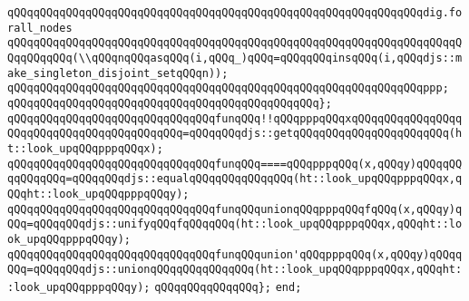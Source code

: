 \newline
\verb|qQQqqQQqqQQqqQQqqQQqqQQqqQQqqQQqqQQqqQQqqQQqqQQqqQQqqQQqqQQqqQQqdig.forall_nodes|\newline
\verb|qQQqqQQqqQQqqQQqqQQqqQQqqQQqqQQqqQQqqQQqqQQqqQQqqQQqqQQqqQQqqQQqqQQqqQQqqQQqqQQq(\\qQQqnqQQqasqQQq(i,qQQq_)qQQq=qQQqqQQqinsqQQq(i,qQQqdjs::make_singleton_disjoint_setqQQqn));|\newline
\newline
\verb|qQQqqQQqqQQqqQQqqQQqqQQqqQQqqQQqqQQqqQQqqQQqqQQqqQQqqQQqqQQqqQQqppp;|\newline
\verb|qQQqqQQqqQQqqQQqqQQqqQQqqQQqqQQqqQQqqQQqqQQqqQQq};|\newline
\newline
\verb|qQQqqQQqqQQqqQQqqQQqqQQqqQQqqQQqfunqQQq!!qQQqpppqQQqxqQQqqQQqqQQqqQQqqQQqqQQqqQQqqQQqqQQqqQQqqQQq=qQQqqQQqdjs::getqQQqqQQqqQQqqQQqqQQqqQQq(ht::look_upqQQqpppqQQqx);|\newline
\verb|qQQqqQQqqQQqqQQqqQQqqQQqqQQqqQQqfunqQQq====qQQqpppqQQq(x,qQQqy)qQQqqQQqqQQqqQQq=qQQqqQQqdjs::equalqQQqqQQqqQQqqQQq(ht::look_upqQQqpppqQQqx,qQQqht::look_upqQQqpppqQQqy);|\newline
\verb|qQQqqQQqqQQqqQQqqQQqqQQqqQQqqQQqfunqQQqunionqQQqpppqQQqfqQQq(x,qQQqy)qQQq=qQQqqQQqdjs::unifyqQQqfqQQqqQQq(ht::look_upqQQqpppqQQqx,qQQqht::look_upqQQqpppqQQqy);|\newline
\verb|qQQqqQQqqQQqqQQqqQQqqQQqqQQqqQQqfunqQQqunion'qQQqpppqQQq(x,qQQqy)qQQqqQQq=qQQqqQQqdjs::unionqQQqqQQqqQQqqQQq(ht::look_upqQQqpppqQQqx,qQQqht::look_upqQQqpppqQQqy);|\newline
\verb|qQQqqQQqqQQqqQQq};|\newline
\verb|end;|\newline

